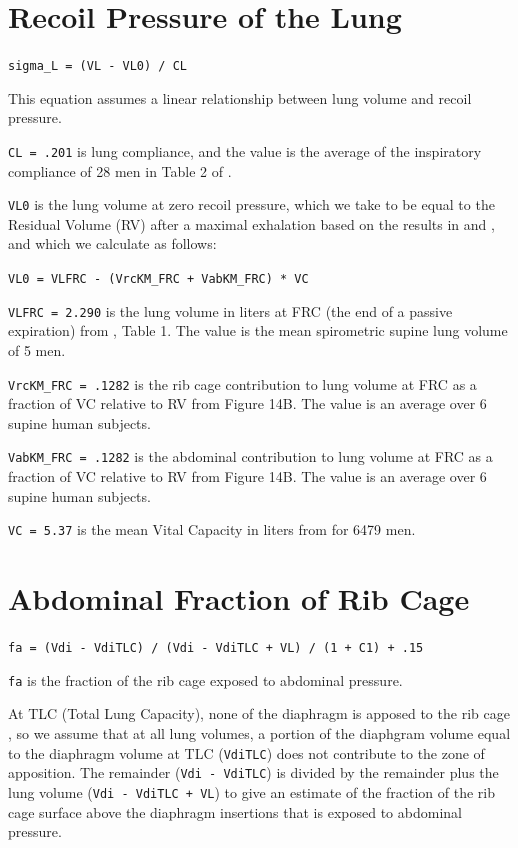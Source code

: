 \documentclass[12pt,openany,oneside]{book}
\newcommand{\ticode}[1]{\texttt{#1}}
\begin{document}
\section{Recoil Pressure of the Lung}
\label{Recoil Pressure of the Lung}

\ticode{sigma\_L = (VL - VL0) / CL}

This equation assumes a linear relationship between lung volume and
recoil pressure.  

\verb~CL = .201~ is lung compliance, and the value is the average of
the inspiratory compliance of 28 men in Table 2 of
\citet{Permutt01091960}.

\verb~VL0~ is the lung volume at
zero recoil pressure, which we take to be equal to the Residual Volume
(RV) after a maximal exhalation based on the results in
\citet{Permutt01091960} and \citet{Harris2005}, and which we calculate
as follows:

\ticode{VL0 = VLFRC - (VrcKM\_FRC + VabKM\_FRC) * VC}

\verb~VLFRC = 2.290~ is the lung volume in liters at FRC (the end of a
passive expiration) from \citet{Cluzel01052000}, Table 1.  The value
is the mean spirometric supine lung volume of 5 men.

\verb~VrcKM_FRC = .1282~ is the rib cage contribution to lung volume
at FRC as a fraction of VC relative to RV from \citet{Konno1967}
Figure 14B.  The value is an average over 6 supine human subjects.

\verb~VabKM_FRC = .1282~ is the abdominal contribution to lung volume
at FRC as a fraction of VC relative to RV from \citet{Konno1967}
Figure 14B.  The value is an average over 6 supine human subjects.

\verb~VC = 5.37~ is the mean Vital Capacity in liters from
\citet{Roca01061998} for 6479 men.

\section{Abdominal Fraction of Rib Cage}

\ticode{fa = (Vdi - VdiTLC) / (Vdi - VdiTLC + VL) / (1 + C1) + .15}

\verb~fa~ is the fraction of the rib cage exposed to abdominal
pressure.

At TLC (Total Lung Capacity), none of the diaphragm is apposed to the
rib cage \citep{Mead01091982}, so we assume that at all lung volumes,
a portion of the diaphgram volume equal to the diaphragm volume at TLC
(\verb~VdiTLC~) does not contribute to the zone of apposition.  The
remainder (\verb~Vdi - VdiTLC~) is divided by the remainder plus the
lung volume (\verb~Vdi - VdiTLC + VL~) to give an estimate of the
fraction of the rib cage surface above the diaphragm insertions that
is exposed to abdominal pressure.
\end{document}
